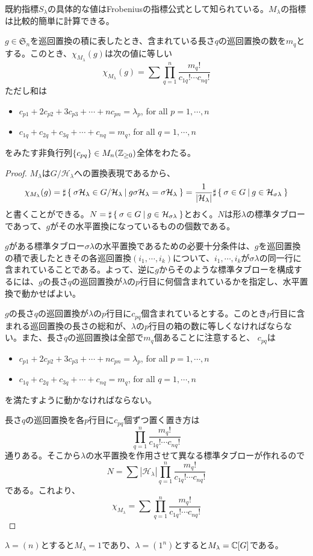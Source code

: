 \documentclass{ltjsreport}
\begin{document}
既約指標$S_\lambda$の具体的な値はFrobeniusの指標公式として知られている。$M_\lambda$の指標は比較的簡単に計算できる。

\begin{prop}\label{m_lambda_char_1}
  $g\in\mathfrak{S}_n$を巡回置換の積に表したとき、含まれている長さ$q$の巡回置換の数を$m_q$とする。このとき、$\chi_{M_\lambda}(g)$は次の値に等しい
  \[
  \chi_{M_\lambda}(g)=\sum\prod_{q=1}^n\frac{m_q!}{c_{1q}!\cdots c_{nq}!}  
  \]
  ただし和は
  \begin{itemize}
    \item $c_{p1}+2c_{p2}+3c_{p3}+\cdots+nc_{pn}=\lambda_p$, for all $p=1,\cdots,n$
    \item $c_{1q}+c_{2q}+c_{3q}+\cdots+c_{nq}=m_q$, for all $q=1,\cdots,n$
  \end{itemize}
  をみたす非負行列$\{c_{pq}\}\in M_n(\mathbb{Z}_{\geq 0})$全体をわたる。
\end{prop}

\begin{proof}
  $M_\lambda$は$G/\mathcal{H}_\lambda$への置換表現であるから、
  \[
  \chi_{M_\lambda}(g)
  =\sharp\left\{\:\sigma\mathcal{H}_{\lambda}\in G/\mathcal{H}_\lambda\:\middle|\:g\sigma\mathcal{H}_\lambda=\sigma\mathcal{H}_\lambda\:\right\}
  =\frac{1}{|\mathcal{H}_\lambda|}\sharp\left\{\:\sigma\in G\:\middle|\:g\in\mathcal{H}_{\sigma\lambda}\:\right\}
  \]
  と書くことができる。$N=\sharp\left\{\:\sigma\in G\:\middle|\:g\in\mathcal{H}_{\sigma\lambda}\:\right\}$とおく。$N$は形$\lambda$の標準タブローであって、$g$がその水平置換になっているものの個数である。
  
  $g$がある標準タブロー$\sigma\lambda$の水平置換であるための必要十分条件は、$g$を巡回置換の積で表したときその各巡回置換$(i_1,\cdots,i_k)$について、$i_1,\cdots,i_k$が$\sigma\lambda$の同一行に含まれていることである。よって、逆に$g$からそのような標準タブローを構成するには、$g$の長さ$q$の巡回置換が$\lambda$の$p$行目に何個含まれているかを指定し、水平置換で動かせばよい。

  $g$の長さ$q$の巡回置換が$\lambda$の$p$行目に$c_{pq}$個含まれているとする。このとき$p$行目に含まれる巡回置換の長さの総和が、$\lambda$の$p$行目の箱の数に等しくなければならない。また、長さ$q$の巡回置換は全部で$m_q$個あることに注意すると、
  $c_{pq}$は
  \begin{itemize}
    \item $c_{p1}+2c_{p2}+3c_{p3}+\cdots+nc_{pn}=\lambda_p$, for all $p=1,\cdots,n$
    \item $c_{1q}+c_{2q}+c_{3q}+\cdots+c_{nq}=m_q$, for all $q=1,\cdots,n$
  \end{itemize}
  を満たすように動かなければならない。

  長さ$q$の巡回置換を各$p$行目に$c_{pq}$個ずつ置く置き方は
  \[
    \prod_{q=1}^n\frac{m_q!}{c_{1q}!\cdots c_{nq}!}    
  \]
  通りある。そこから$\lambda$の水平置換を作用させて異なる標準タブローが作れるので
  \[
  N=\sum|\mathcal{H}_\lambda|\prod_{q=1}^n\frac{m_q!}{c_{1q}!\cdots c_{nq}!}  
  \]
  である。これより、
  \[
  \chi_{M_\lambda}=\sum\prod_{q=1}^n\frac{m_q!}{c_{1q}!\cdots c_{nq}!}   
  \]
\end{proof}

\begin{eg}
  $\lambda=(n)$とすると$M_\lambda=1$であり、$\lambda=(1^n)$とすると$M_\lambda=\mathbb{C}[G]$である。
\end{eg}
\end{document}
